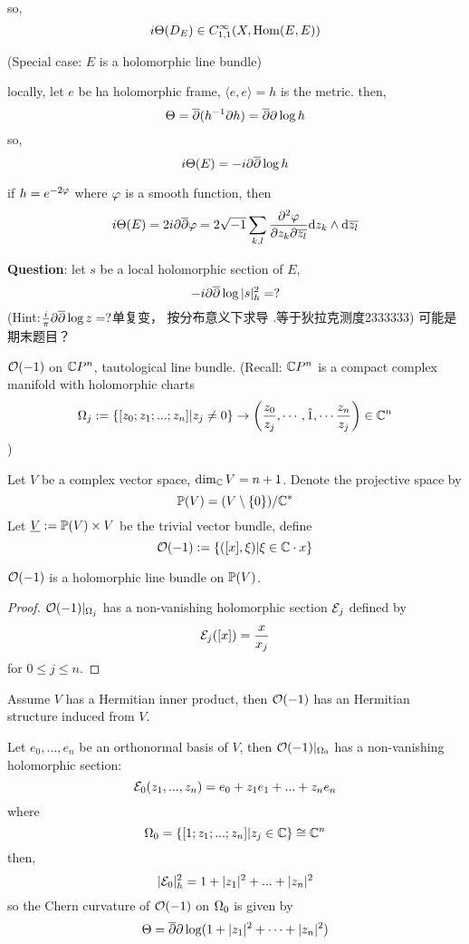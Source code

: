 so,
$$i\Theta(D_E)\in C_{1,1}^\infty(X,\operatorname{Hom}(E,E))$$

\begin{example}(Special case: $E$ is  a holomorphic line bundle)

locally, let $e$ be ha holomorphic frame,
$\langle e,e\rangle=h$ is the metric.
then,
$$\Theta=\overline{\partial}(h^{-1}\partial h)=\overline{\partial}\partial\log h$$
so,
$$i\Theta(E)=-i\partial\overline{\partial}\log h$$
\end{example}
if $h=e^{-2\varphi}$ where $\varphi$ is a smooth function, then
$$i\Theta(E)=2i\partial\overline{\partial}\varphi
=2\sqrt{-1}\sum_{k,l}\frac{\partial^2{\varphi}} {\partial{z_k}\partial{\overline{z_l}}}
\mathrm{d} z_k\wedge\mathrm{d}\overline{z_l}
$$

\textbf{Question}: let $s$ be a local holomorphic section of $E$,
$$-i\partial\overline{\partial}\log|s|_h^2=?$$
(Hint:$\frac{i}{\pi}\partial\overline{\partial}\log z=?$单复变，
按分布意义下求导 .等于狄拉克测度2333333)
{\color{red}可能是期末题目？}

\begin{example}
$\mathcal{O}(-1)$ on $\mathbb{C} P^n$, tautological line bundle.
(Recall: $\mathbb{C} P^n$ is a compact complex manifold with holomorphic charts
$$\Omega_j:=\{[z_0;z_1;...;z_n]|z_j\neq 0\}\to
\left(
\frac{z_0}{z_j},\cdots,\hat{1},\cdots
\frac{z_n}{z_j}
\right)\in\mathbb{C}^n$$
)
\end{example}

Let $V$ be a complex vector space, $\dim_{\mathbb{C}} V=n+1$.
Denote the projective space by
$$\mathbb{P}(V)=(V\setminus\{0\})/\mathbb{C}^*$$
Let $\underline{V}:=\mathbb{P}(V)\times V$ be the trivial vector bundle,
define
$$\mathcal{O}(-1):=\{([x],\xi)|\xi\in\mathbb{C}\cdot x\}$$

\begin{prop}
$\mathcal{O}(-1)$ is a holomorphic line bundle on $\mathbb{P}(V)$.
\end{prop}
\begin{proof}
$\mathcal{O}(-1)|_{\Omega_j}$ has a non-vanishing holomorphic section $\mathcal{E}_j$ defined by
$$\mathcal{E}_j([x])=\frac{x}{x_j}$$
for $0\leq j\leq n$.
\end{proof}

Assume $V$ has a Hermitian inner product, then $\mathcal{O}(-1)$ has an
Hermitian structure induced from $V$.

Let $e_0,...,e_n$ be an orthonormal basis of $V$, then
$\mathcal{O}(-1)|_{\Omega_0}$ has a non-vanishing holomorphic section:
$$\mathcal{E}_0(z_1,...,z_n)=e_0+z_1e_1+...+z_ne_n$$
where
$$\Omega_0=\{[1;z_1;...;z_n]|z_j\in\mathbb{C}\}\cong\mathbb{C}^n$$
then,
$$|\mathcal{E}_0|^2_h=1+|z_1|^2+...+|z_n|^2$$
so the Chern curvature of $\mathcal{O}(-1)$ on $\Omega_0$ is given by
$$\Theta=\overline{\partial}\partial\log(1+|z_1|^2+\cdots+|z_n|^2)$$

